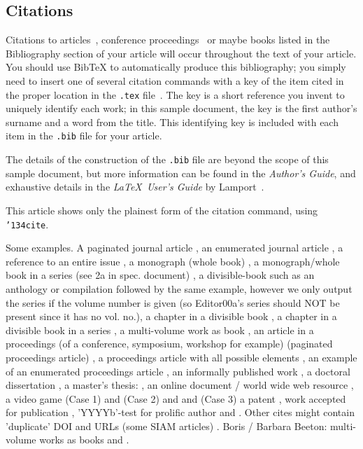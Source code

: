 \subsection{Citations}
Citations to articles~\cite{bowman:reasoning,
clark:pct, braams:babel, herlihy:methodology},
conference proceedings~\cite{clark:pct} or maybe
books \cite{Lamport:LaTeX, salas:calculus} listed
in the Bibliography section of your
article will occur throughout the text of your article.
You should use BibTeX to automatically produce this bibliography;
you simply need to insert one of several citation commands with
a key of the item cited in the proper location in
the \texttt{.tex} file~\cite{Lamport:LaTeX}.
The key is a short reference you invent to uniquely
identify each work; in this sample document, the key is
the first author's surname and a
word from the title. This identifying key is included
with each item in the \texttt{.bib} file for your article.

The details of the construction of the \texttt{.bib} file
are beyond the scope of this sample document, but more
information can be found in the \textit{Author's Guide},
and exhaustive details in the \textit{\LaTeX\ User's
Guide} by Lamport~.

This article shows only the plainest form
of the citation command, using \texttt{{\char'134}cite}.

Some examples. A paginated journal article \cite{Abril07}, an enumerated
journal article \cite{Cohen07}, a reference to an entire issue \cite{JCohen96},
a monograph (whole book) \cite{Kosiur01}, a monograph/whole book in a series (see 2a in spec. document)
\cite{Harel79}, a divisible-book such as an anthology or compilation \cite{Editor00}
followed by the same example, however we only output the series if the volume number is given
\cite{Editor00a} (so Editor00a's series should NOT be present since it has no vol. no.),
a chapter in a divisible book \cite{Spector90}, a chapter in a divisible book
in a series \cite{Douglass98}, a multi-volume work as book \cite{Knuth97},
an article in a proceedings (of a conference, symposium, workshop for example)
(paginated proceedings article) \cite{Andler79}, a proceedings article
with all possible elements \cite{Smith10}, an example of an enumerated
proceedings article \cite{VanGundy07},
an informally published work \cite{Harel78}, a doctoral dissertation \cite{Clarkson85},
a master's thesis: \cite{anisi03}, an online document / world wide web
resource \cite{Thornburg01, Ablamowicz07, Poker06}, a video game (Case 1) \cite{Obama08} and (Case 2) \cite{Novak03}
and \cite{Lee05} and (Case 3) a patent \cite{JoeScientist001},
work accepted for publication \cite{rous08}, 'YYYYb'-test for prolific author
\cite{SaeediMEJ10} and \cite{SaeediJETC10}. Other cites might contain
'duplicate' DOI and URLs (some SIAM articles) \cite{Kirschmer:2010:AEI:1958016.1958018}.
Boris / Barbara Beeton: multi-volume works as books
\cite{MR781536} and \cite{MR781537}.

